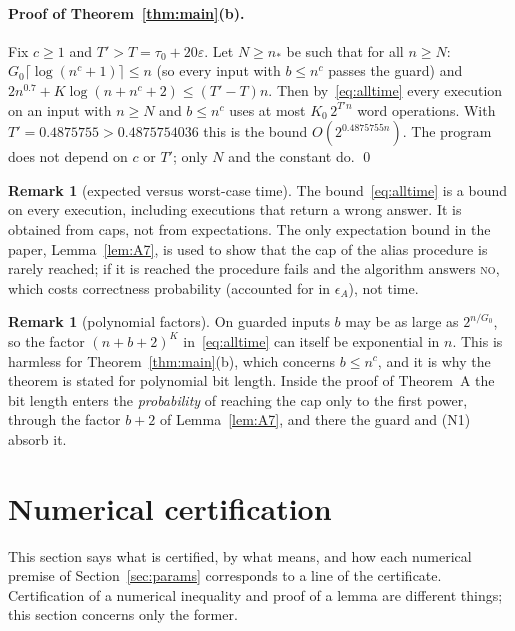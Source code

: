 \documentclass[11pt]{article}
\theoremstyle{definition}
\newtheorem{remark}[lemma]{Remark}
\newcommand{\eps}{\varepsilon}
\newcommand{\ceil}[1]{\lceil #1\rceil}
\begin{document}
\paragraph{Proof of Theorem~\ref{thm:main}(b).} Fix $c\ge1$ and $T'>T=\tau_0+20\eps$. Let $N\ge n_\ast$ be such that
for all $n\ge N$: $G_0\ceil{\log(n^c+1)}\le n$ (so every input with $b\le n^c$ passes the guard) and
$2n^{0.7}+K\log(n+n^c+2)\le(T'-T)n$. Then by~\eqref{eq:alltime} every execution on an input with $n\ge N$ and
$b\le n^c$ uses at most $K_0\,2^{T'n}$ word operations. With $T'=0.4875755>0.4875754036$ this is the bound
$O(2^{0.4875755n})$. The program does not depend on $c$ or $T'$; only $N$ and the constant do. \qed

\begin{remark}[expected versus worst-case time]\label{rem:worst}
The bound~\eqref{eq:alltime} is a bound on every execution, including executions that return a wrong answer. It is
obtained from caps, not from expectations. The only expectation bound in the paper, Lemma~\ref{lem:A7}, is used to
show that the cap of the alias procedure is rarely reached; if it is reached the procedure fails and the algorithm
answers \textsc{no}, which costs correctness probability (accounted for in $\epsilon_A$), not time.
\end{remark}

\begin{remark}[polynomial factors]\label{rem:polyfactors}
On guarded inputs $b$ may be as large as $2^{n/G_0}$, so the factor $(n+b+2)^K$ in~\eqref{eq:alltime} can itself be
exponential in $n$. This is harmless for Theorem~\ref{thm:main}(b), which concerns $b\le n^c$, and it is why the
theorem is stated for polynomial bit length. Inside the proof of Theorem~A the bit length enters the
\emph{probability} of reaching the cap only to the first power, through the factor $b+2$ of Lemma~\ref{lem:A7},
and there the guard and \textup{(N1)} absorb it.
\end{remark}
\section{Numerical certification}\label{sec:cert}
This section says what is certified, by what means, and how each numerical premise of Section~\ref{sec:params}
corresponds to a line of the certificate. Certification of a numerical inequality and proof of a lemma are
different things; this section concerns only the former.
\end{document}
